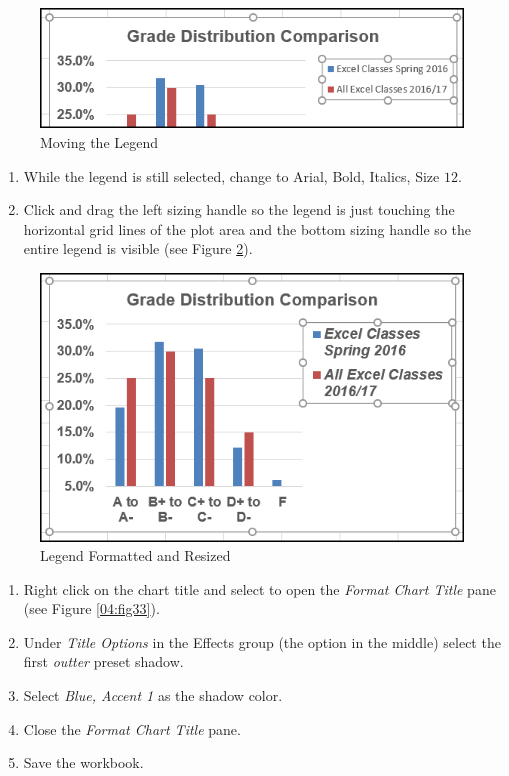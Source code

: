 \begin{figure}[H]
	\centering
	\includegraphics[width=\maxwidth{.95\linewidth}]{gfx/ch04_fig31}
	\caption{Moving the Legend}
	\label{04:fig31}
\end{figure}

\begin{enumerate}
	\item While the legend is still selected, change  to Arial, Bold, Italics, Size $ 12 $.
	\item Click and drag the left sizing handle so the legend is just touching the horizontal grid lines of the plot area and the bottom sizing handle so the entire legend is visible (see Figure \ref{04:fig32}).
\end{enumerate}

\begin{figure}[H]
	\centering
	\includegraphics[width=\maxwidth{.95\linewidth}]{gfx/ch04_fig32}
	\caption{Legend Formatted and Resized}
	\label{04:fig32}
\end{figure}

\begin{enumerate}
	\item Right click on the chart title and select  to open the \textit{Format Chart Title} pane (see Figure \ref{04:fig33}).
	\item Under \textit{Title Options} in the Effects group (the option in the middle) select the first \textit{outter} preset shadow. 
	\item Select \textit{Blue, Accent 1} as the shadow color.
	\item Close the \textit{Format Chart Title} pane.
	\item Save the workbook.
\end{enumerate}

